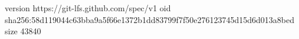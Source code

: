 version https://git-lfs.github.com/spec/v1
oid sha256:58d119044c63bba9a5f66e1372b1dd83799f7f50e276123745d15d6d013a8bed
size 43840
